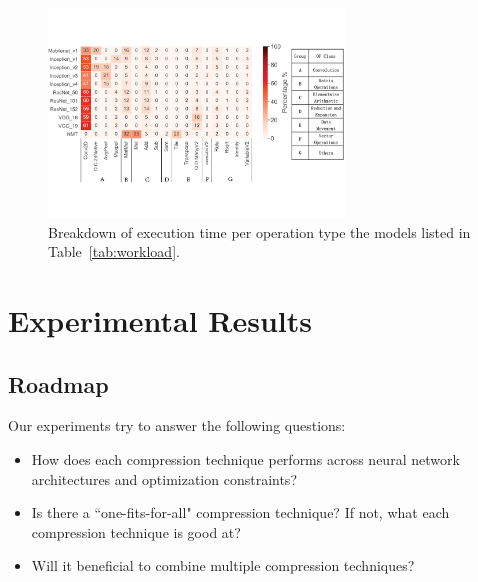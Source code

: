 
\begin{figure}[!t]
\centering
\includegraphics[width=0.7\textwidth]{figure/break11models.pdf}
\caption{Breakdown of execution time per operation type the models listed in Table~\ref{tab:workload}.}
 \label{fig:breakdown11}
\end{figure}







\section{Experimental Results}


\subsection{Roadmap}
Our experiments try to answer the following questions:

\begin{itemize}
\item How does each compression technique performs across neural network architectures and optimization constraints?
\item Is there a ``one-fits-for-all" compression technique? If not, what each compression technique is good at?
\item Will it beneficial to combine multiple compression techniques?
\end{itemize}

